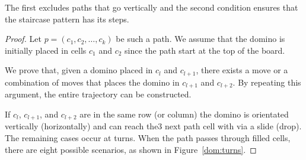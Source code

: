 The first excludes paths that go vertically and the second condition ensures that the staircase pattern has its steps.



\begin{proof}
  Let \( p = (c_1, c_2, \dots, c_k) \) be such a path. We assume that the domino is initially placed in cells \( c_1 \) and \( c_2 \) since the path start at the top of the board.

  We prove that, given a domino placed in \( c_l \) and \( c_{l+1} \), there exists a move or a combination of moves that places the domino in \( c_{l+1} \) and \( c_{l+2} \). By repeating this argument, the entire trajectory can be constructed.

  If \( c_l \), \( c_{l+1} \), and \( c_{l+2} \) are in the same row (or column) the domino is orientated vertically (horizontally) and can reach the3 next path cell with via a slide (drop). The remaining cases occur at turns. When the path passes through filled cells, there are eight possible scenarios, as shown in Figure~\ref{dom:turns}.


\end{proof}

